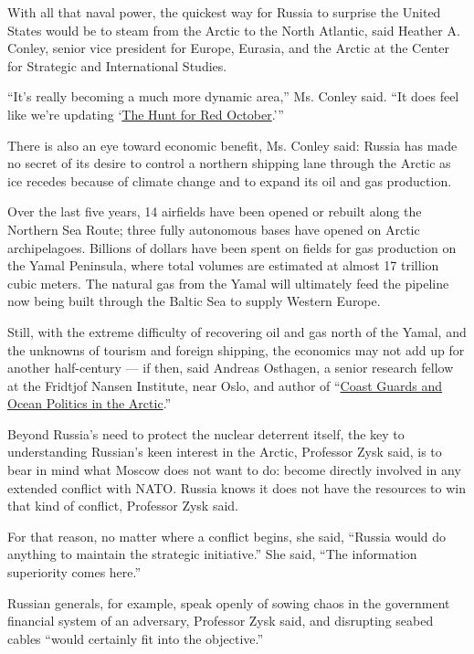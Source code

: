 With all that naval power, the quickest way for Russia to surprise the
United States would be to steam from the Arctic to the North Atlantic,
said Heather A. Conley, senior vice president for Europe, Eurasia, and
the Arctic at the Center for Strategic and International Studies.

``It's really becoming a much more dynamic area,'' Ms. Conley said. ``It
does feel like we're updating
`\href{https://www.nytimes.com/1985/04/21/books/fiction-in-short.html}{The
Hunt for Red October}.'''

There is also an eye toward economic benefit, Ms. Conley said: Russia
has made no secret of its desire to control a northern shipping lane
through the Arctic as ice recedes because of climate change and to
expand its oil and gas production.

Over the last five years, 14 airfields have been opened or rebuilt along
the Northern Sea Route; three fully autonomous bases have opened on
Arctic archipelagoes. Billions of dollars have been spent on fields for
gas production on the Yamal Peninsula, where total volumes are estimated
at almost 17 trillion cubic meters. The natural gas from the Yamal will
ultimately feed the pipeline now being built through the Baltic Sea to
supply Western Europe.

Still, with the extreme difficulty of recovering oil and gas north of
the Yamal, and the unknowns of tourism and foreign shipping, the
economics may not add up for another half-century --- if then, said
Andreas Osthagen, a senior research fellow at the Fridtjof Nansen
Institute, near Oslo, and author of
``\href{https://www.palgrave.com/gp/book/9789811507533}{Coast Guards and
Ocean Politics in the Arctic}.''

Beyond Russia's need to protect the nuclear deterrent itself, the key to
understanding Russian's keen interest in the Arctic, Professor Zysk
said, is to bear in mind what Moscow does not want to do: become
directly involved in any extended conflict with NATO. Russia knows it
does not have the resources to win that kind of conflict, Professor Zysk
said.

For that reason, no matter where a conflict begins, she said, ``Russia
would do anything to maintain the strategic initiative.'' She said,
``The information superiority comes here.''

Russian generals, for example, speak openly of sowing chaos in the
government financial system of an adversary, Professor Zysk said, and
disrupting seabed cables ``would certainly fit into the objective.''

